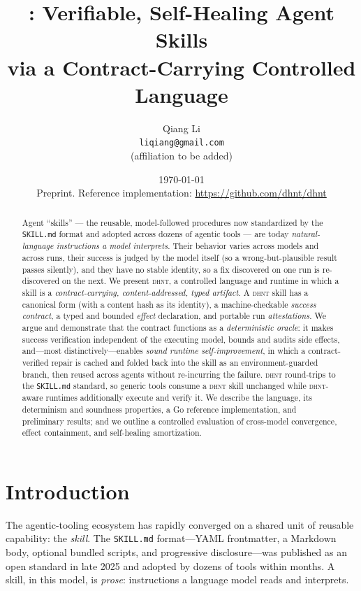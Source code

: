 \documentclass[11pt]{article}
\title{\dhnt{}: Verifiable, Self-Healing Agent Skills\\
via a Contract-Carrying Controlled Language}
\author{Qiang Li\\
\texttt{liqiang@gmail.com}\\[2pt]
\small (affiliation to be added)}
\date{\today\\[4pt]\small Preprint. Reference implementation:
\url{https://github.com/dhnt/dhnt}}
\newcommand{\dhnt}{\textsc{dhnt}}
\begin{document}
\maketitle

\begin{abstract}
Agent ``skills'' --- the reusable, model-followed procedures now standardized by
the \texttt{SKILL.md} format and adopted across dozens of agentic tools --- are
today \emph{natural-language instructions a model interprets}. Their behavior
varies across models and across runs, their success is judged by the model
itself (so a wrong-but-plausible result passes silently), and they have no
stable identity, so a fix discovered on one run is re-discovered on the next.
We present \dhnt{}, a controlled language and runtime in which a skill is a
\emph{contract-carrying, content-addressed, typed artifact}. A \dhnt{} skill has
a canonical form (with a content hash as its identity), a machine-checkable
\emph{success contract}, a typed and bounded \emph{effect} declaration, and
portable run \emph{attestations}. We argue and demonstrate that the contract
functions as a \emph{deterministic oracle}: it makes success verification
independent of the executing model, bounds and audits side effects, and---most
distinctively---enables \emph{sound runtime self-improvement}, in which a
contract-verified repair is cached and folded back into the skill as an
environment-guarded branch, then reused across agents without re-incurring the
failure. \dhnt{} round-trips to the \texttt{SKILL.md} standard, so generic tools
consume a \dhnt{} skill unchanged while \dhnt{}-aware runtimes additionally
execute and verify it. We describe the language, its determinism and soundness
properties, a Go reference implementation, and preliminary results; and we
outline a controlled evaluation of cross-model convergence, effect containment,
and self-healing amortization.
\end{abstract}

\section{Introduction}

The agentic-tooling ecosystem has rapidly converged on a shared unit of reusable
capability: the \emph{skill}. The \texttt{SKILL.md} format---YAML frontmatter, a
Markdown body, optional bundled scripts, and progressive disclosure---was
published as an open standard in late 2025 and adopted by dozens of tools within
months. A skill, in this model, is \emph{prose}: instructions a language model
reads and interprets.
\end{document}
